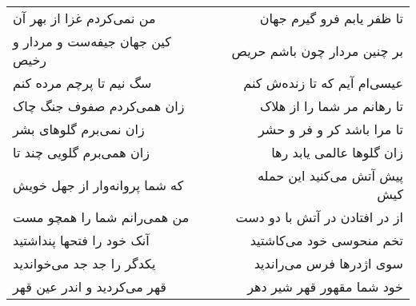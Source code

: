 \begin{center}
\begin{longtable}{l p{0.5cm} r}
من نمی‌کردم غزا از بهر آن
&&
تا ظفر یابم فرو گیرم جهان
\\
کین جهان جیفه‌ست و مردار و رخیص
&&
بر چنین مردار چون باشم حریص
\\
سگ نیم تا پرچم مرده کنم
&&
عیسی‌ام آیم که تا زنده‌ش کنم
\\
زان همی‌کردم صفوف جنگ چاک
&&
تا رهانم مر شما را از هلاک
\\
زان نمی‌برم گلوهای بشر
&&
تا مرا باشد کر و فر و حشر
\\
زان همی‌برم گلویی چند تا
&&
زان گلوها عالمی یابد رها
\\
که شما پروانه‌وار از جهل خویش
&&
پیش آتش می‌کنید این حمله کیش
\\
من همی‌رانم شما را همچو مست
&&
از در افتادن در آتش با دو دست
\\
آنک خود را فتحها پنداشتید
&&
تخم منحوسی خود می‌کاشتید
\\
یکدگر را جد جد می‌خواندید
&&
سوی اژدرها فرس می‌راندید
\\
قهر می‌کردید و اندر عین قهر
&&
خود شما مقهور قهر شیر دهر
\\
\end{longtable}
\end{center}
